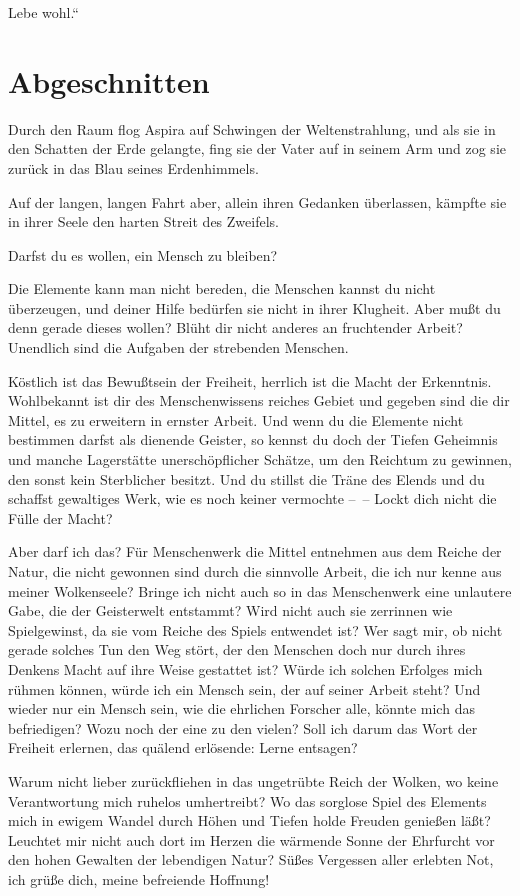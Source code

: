 Lebe wohl.“

\section{Abgeschnitten}

Durch den Raum flog Aspira auf Schwingen der Weltenstrahlung, und
als sie in den Schatten der Erde gelangte, fing sie der Vater auf
in seinem Arm und zog sie zurück in das Blau seines Erdenhimmels.

Auf der langen, langen Fahrt aber, allein ihren Gedanken
überlassen, kämpfte sie in ihrer Seele den harten Streit des
Zweifels.

Darfst du es wollen, ein Mensch zu bleiben?

Die Elemente kann man nicht bereden, die Menschen kannst du nicht
überzeugen, und deiner Hilfe bedürfen sie nicht in ihrer Klugheit.
Aber mußt du denn gerade dieses wollen? Blüht dir nicht anderes an
fruchtender Arbeit? Unendlich sind die Aufgaben der strebenden
Menschen.

Köstlich ist das Bewußtsein der Freiheit, herrlich ist die Macht
der Erkenntnis. Wohlbekannt ist dir des Menschenwissens reiches
Gebiet und gegeben sind die dir Mittel, es zu erweitern in ernster
Arbeit. Und wenn du die Elemente nicht bestimmen darfst als
dienende Geister, so kennst du doch der Tiefen Geheimnis und manche
Lagerstätte unerschöpflicher Schätze, um den Reichtum zu gewinnen,
den sonst kein Sterblicher besitzt. Und du stillst die Träne des
Elends und du schaffst gewaltiges Werk, wie es noch keiner
vermochte –~– Lockt dich nicht die Fülle der Macht?

Aber darf ich das? Für Menschenwerk die Mittel entnehmen aus dem
Reiche der Natur, die nicht gewonnen sind durch die sinnvolle
Arbeit, die ich nur kenne aus meiner Wolkenseele? Bringe ich nicht
auch so in das Menschenwerk eine unlautere Gabe, die der
Geisterwelt entstammt? Wird nicht auch sie zerrinnen wie
Spielgewinst, da sie vom Reiche des Spiels entwendet ist? Wer sagt
mir, ob nicht gerade solches Tun den Weg stört, der den Menschen
doch nur durch ihres Denkens Macht auf ihre Weise gestattet ist?
Würde ich solchen Erfolges mich rühmen können, würde ich ein Mensch
sein, der auf seiner Arbeit steht? Und wieder nur ein Mensch sein,
wie die ehrlichen Forscher alle, könnte mich das befriedigen? Wozu
noch der eine zu den vielen? Soll ich darum das Wort der Freiheit
erlernen, das quälend erlösende: Lerne entsagen?

Warum nicht lieber zurückfliehen in das ungetrübte Reich der
Wolken, wo keine Verantwortung mich ruhelos umhertreibt? Wo das
sorglose Spiel des Elements mich in ewigem Wandel durch Höhen und
Tiefen holde Freuden genießen läßt? Leuchtet mir nicht auch dort im
Herzen die wärmende Sonne der Ehrfurcht vor den hohen Gewalten der
lebendigen Natur? Süßes Vergessen aller erlebten Not, ich grüße
dich, meine befreiende Hoffnung!

